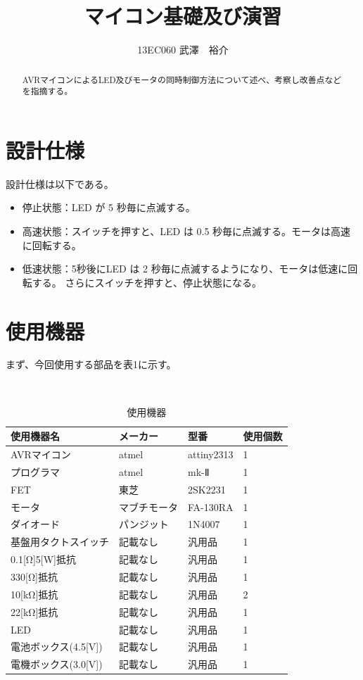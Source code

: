 \documentclass{jsarticle}
\begin{document}
\title{マイコン基礎及び演習}
\author{13EC060 武澤　裕介}
\maketitle
\begin{abstract}
AVRマイコンによるLED及びモータの同時制御方法について述べ、考察し改善点などを指摘する。
\end{abstract}
\section{設計仕様}
設計仕様は以下である。
\begin{itemize}
\item 停止状態：LED が 5 秒毎に点滅する。
\item 高速状態：スイッチを押すと、LED は 0.5 秒毎に点滅する。モータは高速に回転する。
\item 低速状態：5秒後にLED は 2 秒毎に点滅するようになり、モータは低速に回転する。 さらにスイッチを押すと、停止状態になる。 
\end{itemize}
\newpage
\section{使用機器}
まず、今回使用する部品を表1に示す。

\begin{table}[htb]
\caption{使用機器}
\begin{center}  　
\begin{tabular}{|l||l|l|l|} 
\hline
使用機器名 & メーカー &型番 & 使用個数 \\ 
\hline
AVRマイコン & atmel& attiny2313& 1 \\
プログラマ &  atmel& mk-Ⅱ&1 \\
FET & 東芝 & 2SK2231& 1 \\
モータ& マブチモータ & FA-130RA&1 \\
ダイオード & パンジット&1N4007& 1 \\
基盤用タクトスイッチ&記載なし&汎用品&1\\
0.1[Ω]5[W]抵抗& 記載なし&汎用品&1\\
330[Ω]抵抗&記載なし&汎用品&1\\
10[kΩ]抵抗&記載なし&汎用品&2\\
22[kΩ]抵抗&記載なし&汎用品&1\\
LED&記載なし&汎用品&1\\
電池ボックス(4.5[V])&記載なし&汎用品&1\\
電機ボックス(3.0[V])&記載なし&汎用品&1\\
\hline
\end{tabular}
\end{center}
\end{table}
\end{document}
